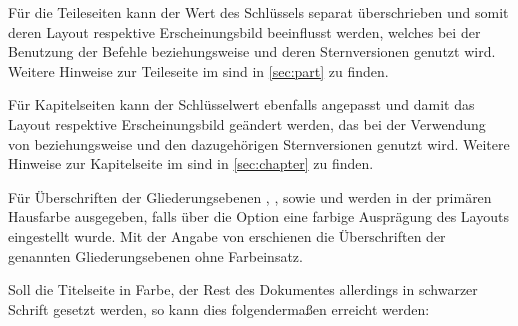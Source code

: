 \begin{Declaration*}{}
\begin{Declaration*}{}
\begin{Declaration*}{}
\begin{Declaration}[%
  v2.03!\Option{cdpart=bicolor}:%
    Farbeinsatz nur im Kopf mit farbig abgesetztem Querbalken;
  v2.03!\Option{cdpart=fullcolor}:%
    voller Farbeinsatz mit farbig abgesetztem Querbalken;
  v2.04!\Option{cdpart=barcolor}:nur farbig abgesetzter Querbalken;%
]{}
\printdeclarationlist%
%
%
Für die Teileseiten kann der Wert des Schlüssels  separat 
überschrieben und somit deren Layout respektive Erscheinungsbild beeinflusst 
werden, welches bei der Benutzung der Befehle  beziehungsweise 
 und deren Sternversionen genutzt wird. Weitere Hinweise zur 
Teileseite im \CD sind in \autoref{sec:part} zu finden.
\end{Declaration}

\begin{Declaration}[%
  v2.03!\Option{cdchapter=bicolor}:%
    Farbeinsatz nur im Kopf mit farbig abgesetztem Querbalken;
  v2.03!\Option{cdchapter=fullcolor}:%
    voller Farbeinsatz mit farbig abgesetztem Querbalken;
  v2.04!\Option{cdchapter=barcolor}:nur farbig abgesetzter Querbalken;%
]{}
\printdeclarationlist%
%
%
Für Kapitelseiten kann der Schlüsselwert  ebenfalls angepasst 
und damit das Layout respektive Erscheinungsbild geändert werden, das bei der 
Verwendung von  beziehungsweise  und den 
dazugehörigen Sternversionen genutzt wird. Weitere Hinweise zur Kapitelseite im 
\CD sind in \autoref{sec:chapter} zu finden.
\end{Declaration}

\begin{Declaration}[v2.05]{}
\printdeclarationlist%
%
Für Überschriften der Gliederungsebenen , , 
 sowie  und  werden 
in der primären Hausfarbe  ausgegeben, falls über die Option 
 eine farbige Ausprägung des Layouts eingestellt wurde. Mit 
der Angabe von  erschienen die Überschriften der 
genannten Gliederungsebenen ohne Farbeinsatz.
\end{Declaration}
%
\begin{Example}
Soll die Titelseite in Farbe, der Rest des Dokumentes allerdings in schwarzer 
Schrift gesetzt werden, so kann dies folgendermaßen erreicht werden:
%
%
\end{Example}



\end{Declaration*}
\end{Declaration*}
\end{Declaration*}
